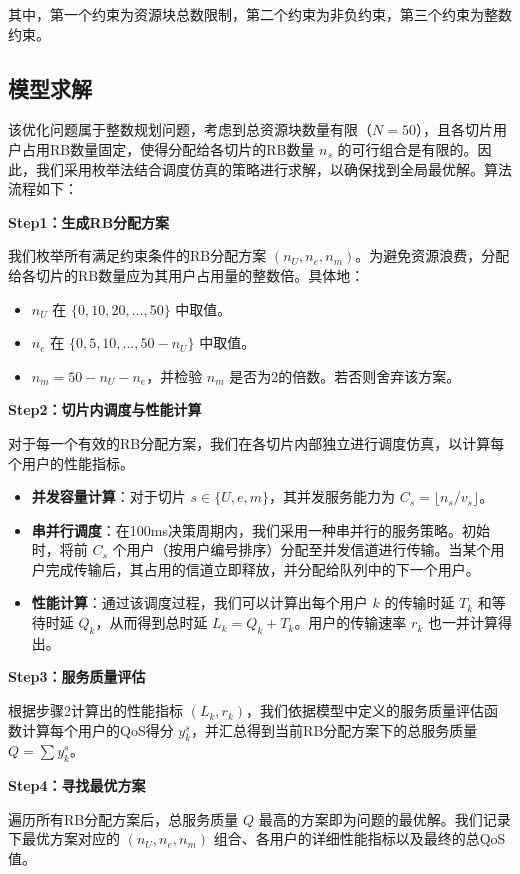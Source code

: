 其中，第一个约束为资源块总数限制，第二个约束为非负约束，第三个约束为整数约束。
\subsection{模型求解}

该优化问题属于整数规划问题，考虑到总资源块数量有限（$N=50$），且各切片用户占用RB数量固定，使得分配给各切片的RB数量 $n_s$ 的可行组合是有限的。因此，我们采用枚举法结合调度仿真的策略进行求解，以确保找到全局最优解。算法流程如下：

\textbf{Step1：生成RB分配方案}

我们枚举所有满足约束条件的RB分配方案 $(n_U, n_e, n_m)$。为避免资源浪费，分配给各切片的RB数量应为其用户占用量的整数倍。具体地：
\begin{itemize}
    \item $n_U$ 在 $\{0, 10, 20, \dots, 50\}$ 中取值。
    \item $n_e$ 在 $\{0, 5, 10, \dots, 50 - n_U\}$ 中取值。
    \item $n_m = 50 - n_U - n_e$，并检验 $n_m$ 是否为2的倍数。若否则舍弃该方案。
\end{itemize}

\textbf{Step2：切片内调度与性能计算}

对于每一个有效的RB分配方案，我们在各切片内部独立进行调度仿真，以计算每个用户的性能指标。
\begin{itemize}
    \item \textbf{并发容量计算}：对于切片 $s \in \{U, e, m\}$，其并发服务能力为 $C_s = \lfloor n_s / v_s \rfloor$。
    \item \textbf{串并行调度}：在100ms决策周期内，我们采用一种串并行的服务策略。初始时，将前 $C_s$ 个用户（按用户编号排序）分配至并发信道进行传输。当某个用户完成传输后，其占用的信道立即释放，并分配给队列中的下一个用户。
    \item \textbf{性能计算}：通过该调度过程，我们可以计算出每个用户 $k$ 的传输时延 $T_k$ 和等待时延 $Q_k$，从而得到总时延 $L_k = Q_k + T_k$。用户的传输速率 $r_k$ 也一并计算得出。
\end{itemize}

\textbf{Step3：服务质量评估}

根据步骤2计算出的性能指标 $(L_k, r_k)$，我们依据模型中定义的服务质量评估函数计算每个用户的QoS得分 $y_k^s$，并汇总得到当前RB分配方案下的总服务质量 $Q = \sum y_k^s$。

\textbf{Step4：寻找最优方案}

遍历所有RB分配方案后，总服务质量 $Q$ 最高的方案即为问题的最优解。我们记录下最优方案对应的 $(n_U, n_e, n_m)$ 组合、各用户的详细性能指标以及最终的总QoS值。

